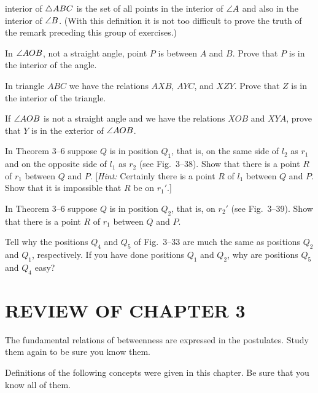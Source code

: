 \documentclass[11pt]{book}
\theoremstyle{bkplain}
\begin{document}
\begin{exercisecols}
\begin{exlist}
      interior of $\triangle ABC$ is the set of all points in the interior of
      $\angle A$ and also in the interior of $\angle B$. (With this definition it
      is not too difficult to prove the truth of the remark preceding this group
      of exercises.)
\item In $\angle AOB$, not a straight angle, point $P$ is between $A$ and $B$.
      Prove that $P$ is in the interior of the angle.
\item In triangle $ABC$ we have the relations $AXB$, $AYC$, and $XZY$. Prove
      that $Z$ is in the interior of the triangle.
\item If $\angle AOB$ is not a straight angle and we have the relations $XOB$ and
      $XYA$, prove that $Y$ is in the exterior of $\angle AOB$.
\item[\stex 12.] In Theorem 3--6 suppose $Q$ is in position $Q_1$, that is, on
      the same side of $l_2$ as $r_1$ and on the opposite side of $l_1$ as $r_2$
      (see Fig.~3--38). Show that there is a point $R$ of $r_1$ between $Q$ and
      $P$. [\emph{Hint:} Certainly there is a point $R$ of $l_1$ between $Q$ and
      $P$. Show that it is impossible that $R$ be on $r_1'$.]
\exfig{\FIGIIITHIRTYEIGHT}
\item[\stex 13.] In Theorem 3--6 suppose $Q$ is in position $Q_2$, that is, on
      $r_2'$ (see Fig.~3--39). Show that there is a point $R$ of $r_1$ between
      $Q$ and $P$.
\exfig{\FIGIIITHIRTYNINE}
\item[\stex 14.] Tell why the positions $Q_4$ and $Q_5$ of Fig.~3--33 are much
      the same as positions $Q_2$ and $Q_1$, respectively. If you have done
      positions $Q_1$ and $Q_2$, why are positions $Q_5$ and $Q_4$ easy?
\end{exlist}
\end{exercisecols}

\section*{REVIEW OF CHAPTER 3}

\begin{exlist}
\item The fundamental relations of betweenness are expressed in the postulates.
      Study them again to be sure you know them.
\item Definitions of the following concepts were given in this chapter. Be sure
      that you know all of them.
\end{exlist}
\end{document}
